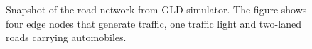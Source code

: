 

 \begin{figure}
    \centering
		
		\hspace{-2em}
   \begin{minipage}{.26\textwidth}
				\caption{Snapshot of the road network from GLD simulator. The figure shows four edge nodes that generate traffic, one traffic light and  two-laned roads carrying automobiles.} 
\label{fig:road-net}


\end{minipage}
\end{figure}
